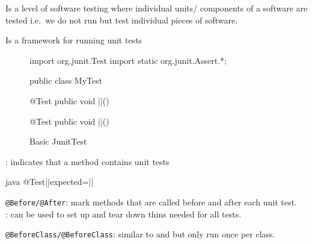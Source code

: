 \begin{defnbox}\nospacing
  \begin{defn}\label{defn:unitTest}
     Is a level of software testing where individual units/ components of a
     software are tested i.e.\ we do not run  but test
     individual pieces of software.
  \end{defn}
\end{defnbox}
\begin{sectionbox}\nospacing
 Is a framework for running unit tests 
 \begin{figure}[H]
   \centering
   \begin{javacode}
     import org.junit.Test
     import static org.junit.Assert.*;

     public class MyTest{

       @Test
       public void ||(){
         
       }
       @Test
       public void ||(){
         
       }
     }
   \end{javacode}
   \caption{Basic JunitTest}
 \end{figure}
\end{sectionbox}
\begin{sectionbox}\nospacing
  \begin{itemizenosep}
      \item {}: indicates that a method contains unit tests
      \begin{mintlinebox}{java}
        @Test|\optla|expected=|\optra|
      \end{mintlinebox}
      \item \texttt{@Before/@After}: mark methods that are called
    before and after each unit test.\\
    : can be used to set up and tear down thins needed for all tests.
      \item \texttt{@BeforeClass/@BeforeClass}: similar to
     and  but only run once per class.
  \end{itemizenosep}
\end{sectionbox}
